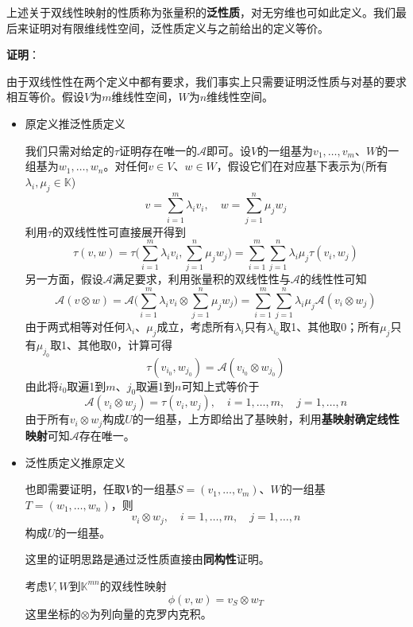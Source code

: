 \documentclass[a4paper,UTF8,fontset=windows,AutoFakeBold]{ctexart}
\newcommand*{\ma}{\mathcal{A}}
\newcommand*{\note}{\noindent *}
\newcommand{\proo}[1]{{\vspace{5pt}\kaishu\noindent\textbf{证明}：\vspace{-3pt}
\begin{compactitem}
    \item[] #1
\end{compactitem}
}}
\begin{document}
上述关于双线性映射的性质称为张量积的\textbf{泛性质}，对无穷维也可如此定义。我们最后来证明对有限维线性空间，泛性质定义与之前给出的定义等价。

\proo{
    由于双线性性在两个定义中都有要求，我们事实上只需要证明泛性质与对基的要求相互等价。假设$V$为$m$维线性空间，$W$为$n$维线性空间。

    \begin{itemize}
        \item 原定义推泛性质定义

        我们只需对给定的$\tau$证明存在唯一的$\ma$即可。设$V$的一组基为$v_1,\dots,v_m$、$W$的一组基为$w_1,\dots,w_n$。对任何$v\in V$、$w\in W$，假设它们在对应基下表示为(所有$\lambda_i,\mu_j\in\mathbb{K}$)
        $$v=\sum_{i=1}^m\lambda_iv_i,\quad w=\sum_{j=1}^n\mu_jw_j$$
        利用$\tau$的双线性性可直接展开得到
        $$\tau(v,w)=\tau\bigg(\sum_{i=1}^m\lambda_iv_i,\sum_{j=1}^n\mu_jw_j\bigg)=\sum_{i=1}^m\sum_{j=1}^n\lambda_i\mu_j\tau(v_i,w_j)$$
        另一方面，假设$\ma$满足要求，利用张量积的双线性性与$\ma$的线性性可知
        $$\ma(v\otimes w)=\ma\bigg(\sum_{i=1}^m\lambda_iv_i\otimes\sum_{j=1}^n\mu_jw_j\bigg)=\sum_{i=1}^m\sum_{j=1}^n\lambda_i\mu_j\ma(v_i\otimes w_j)$$
        由于两式相等对任何$\lambda_i$、$\mu_j$成立，考虑所有$\lambda_i$只有$\lambda_{i_0}$取1、其他取0；所有$\mu_j$只有$\mu_{j_0}$取1、其他取0，计算可得
        $$\tau(v_{i_0},w_{j_0})=\ma(v_{i_0}\otimes w_{j_0})$$
        由此将$i_0$取遍1到$m$、$j_0$取遍1到$n$可知上式等价于
        $$\ma(v_i\otimes w_j)=\tau(v_i,w_j),\quad i=1,\dots,m,\quad j=1,\dots,n$$
        由于所有$v_i\otimes w_j$构成$U$的一组基，上方即给出了基映射，利用\textbf{基映射确定线性映射}可知$\ma$存在唯一。

        \item 泛性质定义推原定义

        也即需要证明，任取$V$的一组基$S=(v_1,\dots,v_m)$、$W$的一组基$T=(w_1,\dots,w_n)$，则
        $$v_i\otimes w_j,\quad i=1,\dots,m,\quad j=1,\dots,n$$
        构成$U$的一组基。
        
        \note 这里的证明思路是通过泛性质直接由\textbf{同构性}证明。

        考虑$V,W$到$\mathbb{K}^{mn}$的双线性映射
        $$\phi(v,w)=v_S\otimes w_T$$
        这里坐标的$\otimes$为列向量的克罗内克积。


\end{itemize}}
\end{document}
